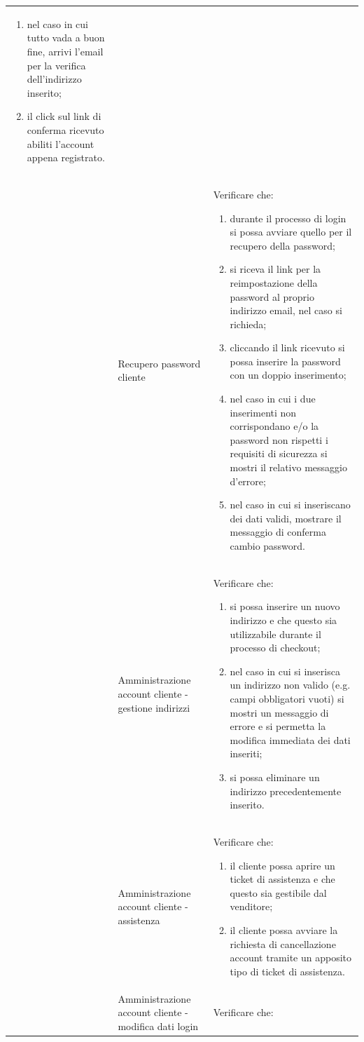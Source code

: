 \begin{center}
\begin{longtable}{|p{1cm}|p{4.85cm}|p{9cm}|}
\begin{enumerate}
		\item nel caso in cui tutto vada a buon fine, arrivi l'email per la verifica dell'indirizzo inserito;
		\item il click sul link di conferma ricevuto abiliti l'account appena registrato.
	\end{enumerate} \\
	 & Recupero password cliente & Verificare che:
	\begin{enumerate}
		\item durante il processo di login si possa avviare quello per il recupero della password;
		\item si riceva il link per la reimpostazione della password al proprio indirizzo email, nel caso si richieda;
		\item cliccando il link ricevuto si possa inserire la password con un doppio inserimento;
		\item nel caso in cui i due inserimenti non corrispondano e/o la password non rispetti i requisiti di sicurezza si mostri il relativo messaggio d'errore;
		\item nel caso in cui si inseriscano dei dati validi, mostrare il messaggio di conferma cambio password.
	\end{enumerate} \\
	 & Amministrazione account cliente - gestione indirizzi & Verificare che:
	\begin{enumerate}
		\item si possa inserire un nuovo indirizzo e che questo sia utilizzabile durante il processo di checkout; 
		\item nel caso in cui si inserisca un indirizzo non valido (e.g. campi obbligatori vuoti) si mostri un messaggio di errore e si permetta la modifica immediata dei dati inseriti;
		\item si possa eliminare un indirizzo precedentemente inserito.
	\end{enumerate} \\
	 & Amministrazione account cliente - assistenza & Verificare che:
	\begin{enumerate}
		\item il cliente possa aprire un ticket di assistenza e che questo sia gestibile dal venditore;
		\item il cliente possa avviare la richiesta di cancellazione account tramite un apposito tipo di ticket di assistenza.
	\end{enumerate} \\
	 & Amministrazione account cliente - modifica dati login & Verificare che:

\end{longtable}
\end{center}
